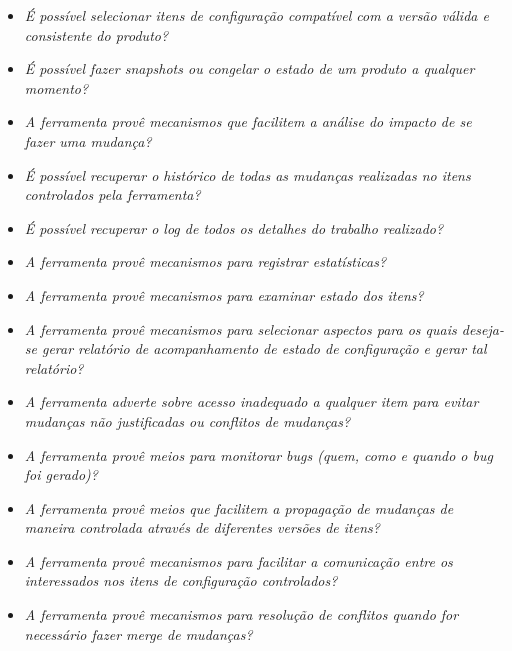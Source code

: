 \begin{itemize}
  \item \textit{É possível selecionar itens de configuração compatível com a versão válida e consistente do
  produto?}
  \item \textit{É possível fazer snapshots ou congelar o estado de um produto a qualquer momento?}
  \item \textit{A ferramenta provê mecanismos que facilitem a análise do impacto de se fazer uma mudança?}
  \item \textit{É possível recuperar o histórico de todas as mudanças realizadas no itens controlados pela
  ferramenta?}
  \item \textit{É possível recuperar o log de todos os detalhes do trabalho realizado?}
  \item \textit{A ferramenta provê mecanismos para registrar estatísticas?}
  \item \textit{A ferramenta provê mecanismos para examinar estado dos itens?}
  \item \textit{A ferramenta provê mecanismos para selecionar aspectos para os quais deseja-se gerar relatório
  de acompanhamento de estado de configuração e gerar tal relatório?}
  \item \textit{A ferramenta adverte sobre acesso inadequado a qualquer item para evitar mudanças não justificadas
  ou conflitos de mudanças?}
  \item \textit{A ferramenta provê meios para monitorar bugs (quem, como e quando o bug foi gerado)?}
  \item \textit{A ferramenta provê meios que facilitem a propagação de mudanças de maneira controlada
  através de diferentes versões de itens?}
  \item \textit{A ferramenta provê mecanismos para facilitar a comunicação entre os interessados nos itens de
  configuração controlados?}
  \item \textit{A ferramenta provê mecanismos para resolução de conflitos quando for necessário fazer merge
  de mudanças?}
\end{itemize}
